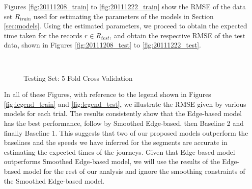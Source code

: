 \documentclass[conference]{IEEEtran.1.8}
\begin{document}
Figures \ref{fig:20111208_train} to \ref{fig:20111222_train} show the RMSE of the data set $R_{train}$ used for estimating the parameters of the models in Section \ref{sec:models}. Using the estimated parameters, we proceed to obtain the expected time taken for the records $r \in R_{test}$, and obtain the respective RMSE of the test data, shown in Figures \ref{fig:20111208_test} to \ref{fig:20111222_test}.
\begin{figure}[htb]
	\centering
	\\
	\caption{Testing Set: 5 Fold Cross Validation}
	\label{fig:5_fold_test}
\end{figure}

In all of these Figures, with reference to the legend shown in Figures \ref{fig:legend_train} and \ref{fig:legend_test}, we illustrate the RMSE given by various models for each trial. The results consistently show that the Edge-based model has the best performance, follow by Smoothed Edge-based, then Baseline 2 and finally Baseline 1. This suggests that two of our proposed models outperform the baselines and the speeds we have inferred for the segments are accurate in estimating the expected times of the journeys. Given that Edge-based model outperforms Smoothed Edge-based model, we will use the results of the Edge-based model for the rest of our analysis and ignore the smoothing constraints of the Smoothed Edge-based model.
\end{document}
